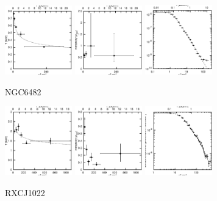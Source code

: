 \documentclass[structabstract]{aa}
\begin{document}
\begin{figure}[h]
   \centering
   \includegraphics[width=0.26\textwidth]{tprofile_ngc6482.eps}
   \includegraphics[width=0.26\textwidth]{zprofile_ngc6482.eps}
   \includegraphics[width=0.26\textwidth]{sbps_ngc6482.eps}
   \caption{NGC6482}
   \label{fig:tprofngc6482}%
\end{figure}
\clearpage
\begin{figure}[h]
   \centering
   \includegraphics[width=0.26\textwidth]{tprofile_rxcj1022.eps}
   \includegraphics[width=0.26\textwidth]{zprofile_rxcj1022.eps}
   \includegraphics[width=0.26\textwidth]{sbps_rxcj1022.eps}
   \caption{RXCJ1022}
   \label{fig:tprofrxcj1022}%
\end{figure}
\end{document}
